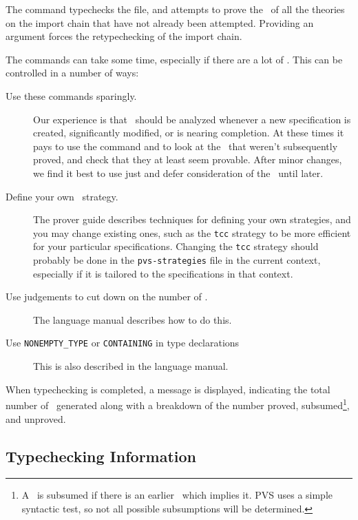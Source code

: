 The  command typechecks the file, and
attempts to prove the \tccs\ of all the theories on the import chain that
have not already been attempted.  Providing an argument forces the
retypechecking of the import chain.

The  commands can take some time, especially if there
are a lot of \tccs.  This can be controlled in a number of ways:
\begin{description}

\item[Use these commands sparingly.] Our experience is that \tccs\ should
be analyzed whenever a new specification is created, significantly
modified, or is nearing completion. 
At these times it pays to use the  command and
to look at the \tccs\ that weren't subsequently proved, and check that
they at least seem provable.
After minor changes, we find it best to use just  and
defer consideration of the \tccs\ until later.


\item[Define your own \tcc\ strategy.] The prover guide describes
techniques for defining your own strategies, and you may change existing
ones, such as the \texttt{tcc} strategy to be more efficient for your
particular specifications.  Changing the \texttt{tcc} strategy should
probably be done in the \texttt{pvs-strategies} file in the current
context, especially if it is tailored to the specifications in that
context.

\item[Use judgements to cut down on the number of
\tccs.]  The language manual describes how to do this.

\item[Use \texttt{NONEMPTY\_TYPE} or \texttt{CONTAINING} in type
declarations]  This is also described in the language manual.

\end{description}

When typechecking is completed, a message is displayed, indicating the
total number of \tccs\ generated along with a breakdown of the number
proved, subsumed\footnote{A \tcc\ is subsumed if there is an earlier
\tcc\ which implies it.  PVS uses a simple syntactic test, so not all
possible subsumptions will be determined.}, and unproved.

\subsection{Typechecking Information}
\label{tc-info}

